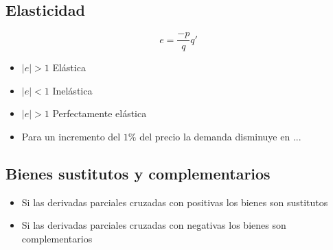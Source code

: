 \subsection{Elasticidad}
$$e=\dfrac{-p}{q}q'$$
\begin{itemize}
	\item $|e|>1$ Elástica
	\item $|e|<1$ Inelástica
	\item $|e|>1$ Perfectamente elástica
	\item Para un incremento del $1\%$ del precio la demanda disminuye en ...
\end{itemize}

\subsection{Bienes sustitutos y complementarios}

\begin{itemize}
	\item Si las derivadas parciales cruzadas con positivas los bienes son sustitutos
	\item Si las derivadas parciales cruzadas con negativas los bienes son complementarios
\end{itemize}

